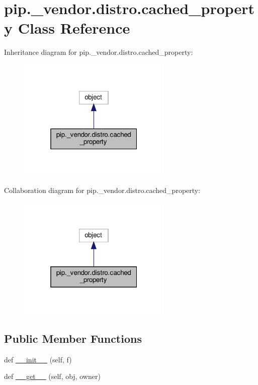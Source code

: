 \hypertarget{classpip_1_1__vendor_1_1distro_1_1cached__property}{}\section{pip.\+\_\+vendor.\+distro.\+cached\+\_\+property Class Reference}
\label{classpip_1_1__vendor_1_1distro_1_1cached__property}


Inheritance diagram for pip.\+\_\+vendor.\+distro.\+cached\+\_\+property\+:
\nopagebreak
\begin{figure}[H]
\begin{center}
\leavevmode
\includegraphics[width=208pt]{classpip_1_1__vendor_1_1distro_1_1cached__property__inherit__graph}
\end{center}
\end{figure}


Collaboration diagram for pip.\+\_\+vendor.\+distro.\+cached\+\_\+property\+:
\nopagebreak
\begin{figure}[H]
\begin{center}
\leavevmode
\includegraphics[width=208pt]{classpip_1_1__vendor_1_1distro_1_1cached__property__coll__graph}
\end{center}
\end{figure}
\subsection*{Public Member Functions}
\begin{DoxyCompactItemize}
\item 
def \hyperlink{classpip_1_1__vendor_1_1distro_1_1cached__property_a4aeccaf6bca828c5962cf469b34ee62a}{\+\_\+\+\_\+init\+\_\+\+\_\+} (self, f)
\item 
def \hyperlink{classpip_1_1__vendor_1_1distro_1_1cached__property_a6e07b3c53bb58c9524e9c21d27c6eaee}{\+\_\+\+\_\+get\+\_\+\+\_\+} (self, obj, owner)
\end{DoxyCompactItemize}


